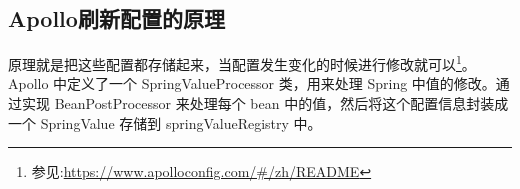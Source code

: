 \documentclass[../../../interview-questions.tex]{subfiles}
\begin{document}
\subsection{Apollo刷新配置的原理}

原理就是把这些配置都存储起来，当配置发生变化的时候进行修改就可以\footnote{参见:\url{https://www.apolloconfig.com/\#/zh/README}}。Apollo 中定义了一个 SpringValueProcessor 类，用来处理 Spring 中值的修改。通过实现 BeanPostProcessor 来处理每个 bean 中的值，然后将这个配置信息封装成一个 SpringValue 存储到 springValueRegistry 中。
\end{document}
